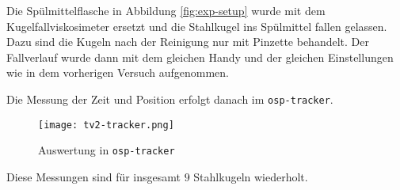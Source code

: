 		Die Spülmittelflasche in Abbildung \ref{fig:exp-setup} wurde mit dem Kugelfallviskosimeter ersetzt und die Stahlkugel ins Spülmittel fallen gelassen. Dazu sind die Kugeln nach der Reinigung nur mit Pinzette behandelt. Der Fallverlauf wurde dann mit dem gleichen Handy und der gleichen Einstellungen wie in dem vorherigen Versuch aufgenommen. 

		Die Messung der Zeit und Position erfolgt danach im \texttt{osp-tracker}.
		\begin{figure}[H]
			\centering
			\captionsetup{width=0.8\linewidth, justification=centering}
			\texttt{[image: tv2-tracker.png]}
			\caption{Auswertung in \texttt{osp-tracker}}
		\end{figure}
		Diese Messungen sind für insgesamt $9$ Stahlkugeln wiederholt.